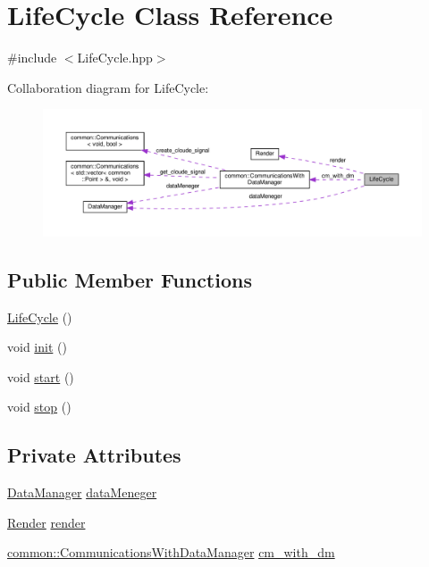 \hypertarget{classLifeCycle}{}\section{Life\+Cycle Class Reference}
\label{classLifeCycle}


{\ttfamily \#include $<$Life\+Cycle.\+hpp$>$}



Collaboration diagram for Life\+Cycle\+:
\nopagebreak
\begin{figure}[H]
\begin{center}
\leavevmode
\includegraphics[width=350pt]{classLifeCycle__coll__graph}
\end{center}
\end{figure}
\subsection*{Public Member Functions}
\begin{DoxyCompactItemize}
\item 
\mbox{\hyperlink{classLifeCycle_a2139a69c371e061d2ad626701bf1fab5}{Life\+Cycle}} ()
\item 
void \mbox{\hyperlink{classLifeCycle_a86541e15b85f778204faad649e56bee6}{init}} ()
\item 
void \mbox{\hyperlink{classLifeCycle_a75a15308cad92f73d7bc9cec52419e41}{start}} ()
\item 
void \mbox{\hyperlink{classLifeCycle_ae61435e991fe8b1847ca2e3553806dc4}{stop}} ()
\end{DoxyCompactItemize}
\subsection*{Private Attributes}
\begin{DoxyCompactItemize}
\item 
\mbox{\hyperlink{classDataManager}{Data\+Manager}} \mbox{\hyperlink{classLifeCycle_adf58bd8151300e569f09b4c64e63c168}{data\+Meneger}}
\item 
\mbox{\hyperlink{classRender}{Render}} \mbox{\hyperlink{classLifeCycle_a3f1ac7946197d0212d2ddea213f16e31}{render}}
\item 
\mbox{\hyperlink{classcommon_1_1CommunicationsWithDataManager}{common\+::\+Communications\+With\+Data\+Manager}} \mbox{\hyperlink{classLifeCycle_a9acd28aae430a04204bf81ab676e0cd7}{cm\+\_\+with\+\_\+dm}}
\end{DoxyCompactItemize}


